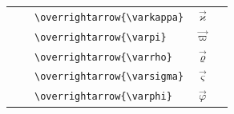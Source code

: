 \documentclass[12pt,a4paper]{article}
\begin{document}
\begin{longtable}{|l|c|l|c|c|}
                                    &                             & \verb|\overrightarrow{\varkappa}|   & $\overrightarrow{\varkappa}$   & \\
                                    &                             & \verb|\overrightarrow{\varpi}|      & $\overrightarrow{\varpi}$      & \\
                                    &                             & \verb|\overrightarrow{\varrho}|     & $\overrightarrow{\varrho}$     & \\
                                    &                             & \verb|\overrightarrow{\varsigma}|   & $\overrightarrow{\varsigma}$   & \\
                                    &                             & \verb|\overrightarrow{\varphi}|     & $\overrightarrow{\varphi}$     & \\
\hline
\end{longtable}
\end{document}
